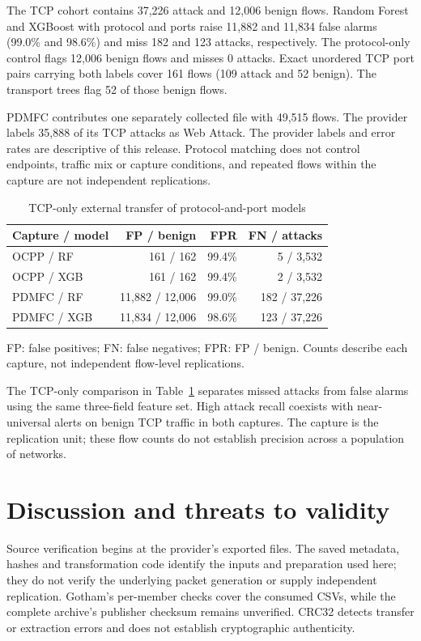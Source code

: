 \documentclass[journal,letterpaper]{IEEEtran}
\begin{document}
The TCP cohort contains 37,226 attack and 12,006 benign flows. Random Forest and XGBoost with protocol and ports raise 11,882 and 11,834 false alarms (99.0\% and 98.6\%) and miss 182 and 123 attacks, respectively. The protocol-only control flags 12,006 benign flows and misses 0 attacks. Exact unordered TCP port pairs carrying both labels cover 161 flows (109 attack and 52 benign). The transport trees flag 52 of those benign flows.

PDMFC contributes one separately collected file with 49,515 flows. The provider labels 35,888 of its TCP attacks as Web Attack. The provider labels and error rates are descriptive of this release. Protocol matching does not control endpoints, traffic mix or capture conditions, and repeated flows within the capture are not independent replications.

\begin{table}[!t]\centering
\caption{TCP-only external transfer of protocol-and-port models}
\label{tab:external-tcp}
\footnotesize\setlength{\tabcolsep}{3pt}\renewcommand{\arraystretch}{1.10}
\begin{tabular}{lrrr}\toprule
\textbf{Capture / model} & \textbf{FP / benign} & \textbf{FPR} & \textbf{FN / attacks} \\\midrule
OCPP / RF & 161 / 162 & 99.4\% & 5 / 3,532 \\
OCPP / XGB & 161 / 162 & 99.4\% & 2 / 3,532 \\
PDMFC / RF & 11,882 / 12,006 & 99.0\% & 182 / 37,226 \\
PDMFC / XGB & 11,834 / 12,006 & 98.6\% & 123 / 37,226 \\
\bottomrule\end{tabular}
\par\smallskip\parbox{\columnwidth}{\footnotesize FP: false positives; FN: false negatives; FPR: FP / benign. Counts describe each capture, not independent flow-level replications.}
\end{table}
The TCP-only comparison in Table~\ref{tab:external-tcp} separates missed attacks from false alarms using the same three-field feature set. High attack recall coexists with near-universal alerts on benign TCP traffic in both captures. The capture is the replication unit; these flow counts do not establish precision across a population of networks.

\section{Discussion and threats to validity}
Source verification begins at the provider's exported files. The saved metadata, hashes and transformation code identify the inputs and preparation used here; they do not verify the underlying packet generation or supply independent replication. Gotham's per-member checks cover the consumed CSVs, while the complete archive's publisher checksum remains unverified. CRC32 detects transfer or extraction errors and does not establish cryptographic authenticity.
\end{document}
